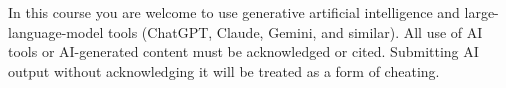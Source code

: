 In this course you are welcome to use generative artificial intelligence and
large-language-model tools (ChatGPT, Claude, Gemini, and similar). All use of AI
tools or AI-generated content must be acknowledged or cited. Submitting AI
output without acknowledging it will be treated as a form of cheating.

